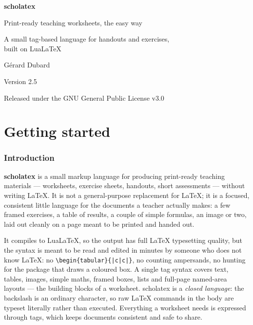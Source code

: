 \documentclass[11pt,a4paper]{article}
\newcommand{\tg}[1]{\texttt{#1}}
\begin{document}
\begin{titlepage}
\centering
\vspace*{3.5cm}
{\Huge\bfseries\color{Navy} scholatex\par}
\vspace{0.8cm}
{\Large Print-ready teaching worksheets, the easy way\par}
\vspace{2.5cm}
{\large A small tag-based language for handouts and exercises,\\[2pt]
built on LuaLaTeX\par}
\vspace{3cm}
{\large Gérard Dubard\par}
\vspace{0.4cm}
{\large Version 2.5\par}
\vfill
{\small Released under the GNU General Public License v3.0\par}
\end{titlepage}

\tableofcontents
\newpage

\part{Getting started}


\section{Introduction}

\textbf{scholatex} is a small markup language for producing print-ready
teaching materials --- worksheets, exercise sheets, handouts, short
assessments --- without writing LaTeX. It is not a general-purpose
replacement for LaTeX; it is a focused, consistent little language for the
documents a teacher actually makes: a few framed exercises, a table of
results, a couple of simple formulas, an image or two, laid out cleanly on
a page meant to be printed and handed out.

It compiles to LuaLaTeX, so the output has full LaTeX typesetting quality,
but the syntax is meant to be read and edited in minutes by someone who
does not know LaTeX: no \tg{\textbackslash begin\{tabular\}\{|c|c|\}}, no
counting ampersands, no hunting for the package that draws a coloured box. A
single tag syntax covers text, tables, images, simple maths, framed boxes,
lists and full-page named-area layouts --- the building blocks of a
worksheet. scholatex is a \emph{closed language}: the backslash is an
ordinary character, so raw LaTeX commands in the body are typeset literally
rather than executed. Everything a worksheet needs is expressed through tags,
which keeps documents consistent and safe to share.
\end{document}
